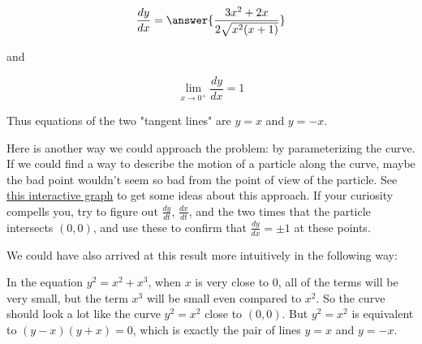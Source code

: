 \documentclass{ximera}
\begin{document}
\begin{exercise}
\[
\frac{dy}{dx} = \answer{\frac{3x^2+2x}{2\sqrt{x^2(x+1)}}}
\]

and

\[
\lim_{x \to 0^+} \frac{dy}{dx} = 1
\]

Thus equations of the two "tangent lines" are $y=x$ and $y=-x$.

Here is another way we could approach the problem:  by parameterizing the curve.  If we could find a way to describe the motion of a particle along the curve, maybe the bad point wouldn't seem so bad from the point of view of the particle. See \href{https://www.desmos.com/calculator/py0camtwlg}{this interactive graph} to get some ideas about this approach.  If your curiosity compells you, try to figure out $\frac{dy}{dt}$, $\frac{dx}{dt}$, and the two times that the particle intersects $(0,0)$, and use these to confirm that $\frac{dy}{dx} = \pm 1$ at these points.

We could have also arrived at this result more intuitively in the following way:

In the equation $y^2 = x^2+x^3$, when $x$ is very close to $0$, all of the terms will be very small, but the term $x^3$ will be small even compared to $x^2$.  So the curve should look a lot like the curve $y^2 = x^2$ close to $(0,0)$.  But $y^2 = x^2$ is equivalent to $(y-x)(y+x)=0$, which is exactly the pair of lines $y=x$ and $y=-x$.
\end{exercise}
\end{document}
